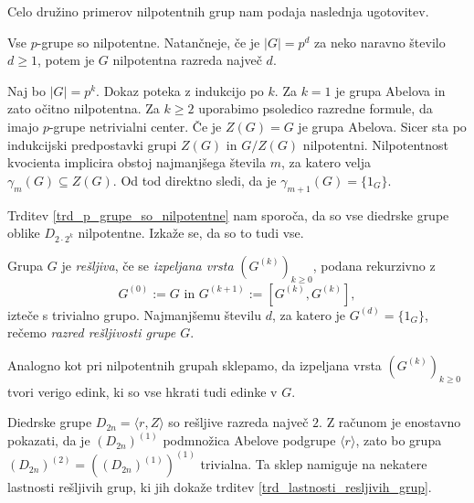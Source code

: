 Celo družino primerov nilpotentnih grup nam podaja naslednja ugotovitev.
\begin{trditev}
\label{trd_p_grupe_so_nilpotentne}
    Vse $p$-grupe so nilpotentne. Natančneje, če je $\lvert G \rvert  = p^{d}$ za neko naravno število $d \ge 1$, potem je $G$ nilpotentna razreda največ $d$. 
\end{trditev}
\begin{dokaz}
    Naj bo $\lvert G \rvert = p^k$. Dokaz poteka z indukcijo po $k$. Za $k = 1$ je grupa Abelova in zato očitno nilpotentna. Za $k \ge 2$ uporabimo psoledico razredne formule, da imajo $p$-grupe netrivialni center.
    Če je $Z(G) = G$ je grupa Abelova. Sicer sta po indukcijski predpostavki grupi $Z(G)$ in $G / Z(G)$ nilpotentni. Nilpotentnost kvocienta implicira obstoj najmanjšega števila $m$, za katero velja $\gamma_m(G) \subseteq Z(G)$.
    Od tod direktno sledi, da je $\gamma_{m + 1}(G) = \{ 1_G \}$.
\end{dokaz}

\begin{primer}
Trditev \ref{trd_p_grupe_so_nilpotentne} nam sporoča, da so vse diedrske grupe oblike $D_{2 \cdot 2^{k}}$ nilpotentne. Izkaže se, da so to tudi vse. %
\end{primer}

\begin{definicija}
    \label{def_resljiva_grupa}
    Grupa $G$ je \emph{rešljiva}, če se \emph{izpeljana vrsta} $(G^{(k)})_{k \ge 0}$, podana rekurzivno z \begin{equation*}
        G^{(0)} := G \text{ in } G^{(k + 1)} := [G^{(k)}, G^{(k)}],
        \end{equation*}  
        izteče s trivialno grupo. Najmanjšemu številu $d$, za katero je $G^{(d)} = \{ 1_G \}$, rečemo \emph{razred rešljivosti grupe $G$}.    
    \end{definicija}

    Analogno kot pri nilpotentnih grupah sklepamo, da izpeljana vrsta $(G^{(k)})_{k \ge 0}$ tvori verigo edink, ki so vse hkrati tudi edinke v $G$.
    
    \begin{primer}
        Diedrske grupe $D_{2n} = \langle r , Z \rangle$ so rešljive razreda največ $2$. Z računom je enostavno pokazati, da je $(D_{2n})^{(1)}$ podmnožica Abelove podgrupe $\langle r \rangle$, zato bo grupa $(D_{2n})^{(2)} = ((D_{2n})^{(1)})^{(1)}$ trivialna.
        Ta sklep namiguje na nekatere lastnosti rešljivih grup, ki jih dokaže trditev \ref{trd_lastnosti_resljivih_grup}. 
    \end{primer}

